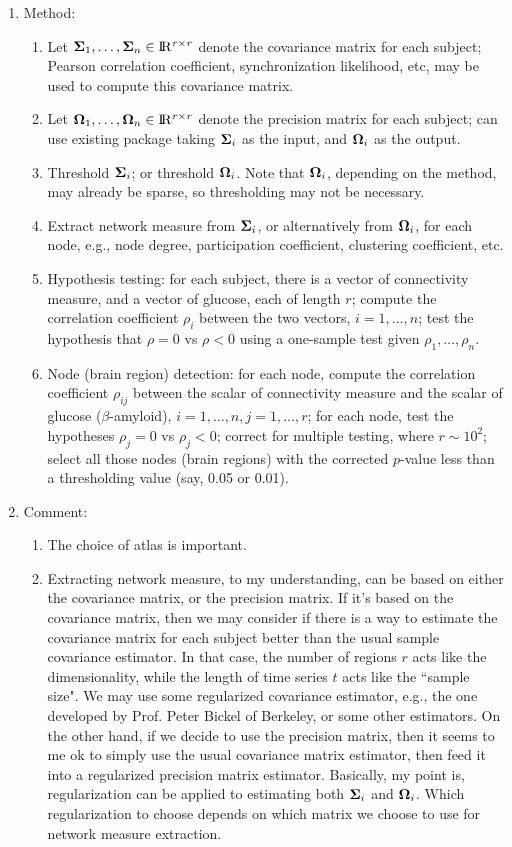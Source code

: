 \documentclass[11pt]{article}
\newcommand{\real}[1]{\mathrm{I \! R} \mathit{^{#1}}}
\newcommand{\greekbold}[1]{\mbox{\boldmath $#1$}}
\newcommand{\Sigmabf}{\greekbold{\Sigma}}
\newcommand{\Omegabf}{\greekbold{\Omega}}
\begin{document}
\begin{enumerate}
\item Method:
\begin{enumerate}[(1)]
\item Let $\Sigmabf_1, \ldots, \Sigmabf_n \in \real{r \times r}$ denote the covariance matrix for each subject; Pearson correlation coefficient, synchronization likelihood, etc, may be used to compute this covariance matrix. 
\item Let $\Omegabf_1, \ldots, \Omegabf_n \in \real{r \times r}$ denote the precision matrix for each subject; can use existing package taking $\Sigmabf_i$ as the input, and $\Omegabf_i$ as the output.  
\item Threshold $\Sigmabf_i$; or threshold $\Omegabf_i$. Note that $\Omegabf_i$, depending on the method, may already be sparse, so thresholding may not be necessary.
\item Extract network measure from $\Sigmabf_i$, or alternatively from $\Omegabf_i$, for each node, e.g., node degree, participation coefficient, clustering coefficient, etc.
\item Hypothesis testing: for each subject, there is a vector of connectivity measure, and a vector of glucose, each of length $r$; compute the correlation coefficient $\rho_i$ between the two vectors, $i=1,\ldots,n$; test the hypothesis that $\rho = 0$ vs $\rho < 0$ using a one-sample test given $\rho_1,\ldots,\rho_n$. 
\item Node (brain region) detection: for each node, compute the correlation coefficient $\rho_{ij}$ between the scalar of connectivity measure and the scalar of glucose ($\beta$-amyloid), $i=1,\ldots,n, j=1,\ldots,r$; for each node, test the hypotheses $\rho_j = 0$ vs $\rho_j < 0$; correct for multiple testing, where $r \sim 10^2$; select all those nodes (brain regions) with the corrected $p$-value less than a thresholding value (say, 0.05 or 0.01). 
\end{enumerate}

\item Comment:
\begin{enumerate}[(1)]
\item The choice of atlas is important. 
\item Extracting network measure, to my understanding, can be based on either the covariance matrix, or the precision matrix. If it's based on the covariance matrix, then we may consider if there is a way to estimate the covariance matrix for each subject better than the usual sample covariance estimator. In that case, the number of regions $r$ acts like the dimensionality, while the length of time series $t$ acts like the ``sample size". We may use some regularized covariance estimator, e.g., the one developed by Prof. Peter Bickel of Berkeley, or some other estimators. On the other hand, if we decide to use the precision matrix, then it seems to me ok to simply use the usual covariance matrix estimator, then feed it into a regularized precision matrix estimator. Basically, my point is, regularization can be applied to estimating both $\Sigmabf_i$ and $\Omegabf_i$. Which regularization to choose depends on which matrix we choose to use for network measure extraction. 
\end{enumerate}

\end{enumerate}
\end{document}
